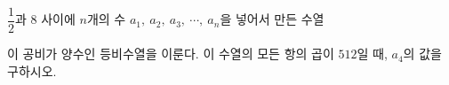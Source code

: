 $\dfrac{1}{2}$과 $8$ 사이에 $n$개의 수 $a_1,\ a_2,\ a_3,\ \cdots,\ a_n$을 넣어서 만든 수열 \par\smallskip{}\par\smallskip\noindent 이 공비가 양수인 등비수열을 이룬다. 이 수열의 모든 항의 곱이 $512$일 때, $a_4$의 값을 구하시오.
